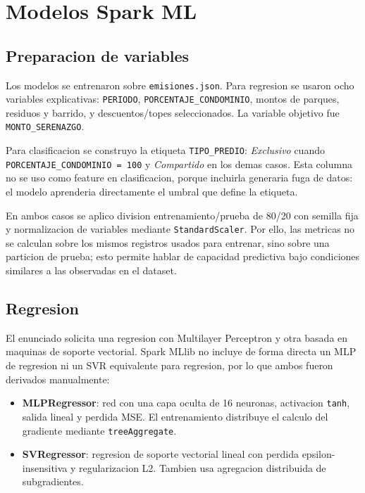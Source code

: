 \section{Modelos Spark ML}

\subsection{Preparacion de variables}

Los modelos se entrenaron sobre \texttt{emisiones.json}. Para regresion se usaron ocho variables explicativas: \texttt{PERIODO}, \texttt{PORCENTAJE\_CONDOMINIO}, montos de parques, residuos y barrido, y descuentos/topes seleccionados. La variable objetivo fue \texttt{MONTO\_SERENAZGO}.

Para clasificacion se construyo la etiqueta \texttt{TIPO\_PREDIO}: \textit{Exclusivo} cuando \texttt{PORCENTAJE\_CONDOMINIO = 100} y \textit{Compartido} en los demas casos. Esta columna no se uso como feature en clasificacion, porque incluirla generaria fuga de datos: el modelo aprenderia directamente el umbral que define la etiqueta.

En ambos casos se aplico division entrenamiento/prueba de 80/20 con semilla fija y normalizacion de variables mediante \texttt{StandardScaler}. Por ello, las metricas no se calculan sobre los mismos registros usados para entrenar, sino sobre una particion de prueba; esto permite hablar de capacidad predictiva bajo condiciones similares a las observadas en el dataset.

\subsection{Regresion}

El enunciado solicita una regresion con Multilayer Perceptron y otra basada en maquinas de soporte vectorial. Spark MLlib no incluye de forma directa un MLP de regresion ni un SVR equivalente para regresion, por lo que ambos fueron derivados manualmente:

\begin{itemize}
    \item \textbf{MLPRegressor}: red con una capa oculta de 16 neuronas, activacion \texttt{tanh}, salida lineal y perdida MSE. El entrenamiento distribuye el calculo del gradiente mediante \texttt{treeAggregate}.
    \item \textbf{SVRegressor}: regresion de soporte vectorial lineal con perdida epsilon-insensitiva y regularizacion L2. Tambien usa agregacion distribuida de subgradientes.
\end{itemize}

